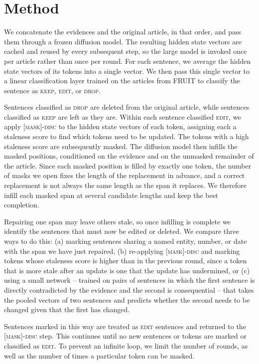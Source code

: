 \documentclass[11pt]{article}
\begin{document}
\section{Method}
We concatenate the evidences and the original article, in that order, and pass them through a frozen diffusion model. The resulting hidden state vectors are cached and reused by every subsequent step, so the large model is invoked once per article rather than once per round. For each sentence, we average the hidden state vectors of its tokens into a single vector. We then pass this single vector to a linear classification layer trained on the articles from FRUIT \citep{iv-etal-2022-fruit} to classify the sentence as \textsc{keep}, \textsc{edit}, or \textsc{drop}.

Sentences classified as \textsc{drop} are deleted from the original article, while sentences classified as \textsc{keep} are left as they are. Within each sentence classified \textsc{edit}, we apply \textsc{[mask]-disc} to the hidden state vectors of each token, assigning each a staleness score to find which tokens need to be updated. The tokens with a high staleness score are subsequently masked. The diffusion model then infills the masked positions, conditioned on the evidence and on the unmasked remainder of the article. Since each masked position is filled by exactly one token, the number of masks we open fixes the length of the replacement in advance, and a correct replacement is not always the same length as the span it replaces. We therefore infill each masked span at several candidate lengths and keep the best completion.

Repairing one span may leave others stale, so once infilling is complete we identify the sentences that must now be edited or deleted. We compare three ways to do this: (a) marking sentences sharing a named entity, number, or date with the span we have just repaired, (b) re-applying \textsc{[mask]-disc} and marking tokens whose staleness score is higher than in the previous round, since a token that is more stale after an update is one that the update has undermined, or (c) using a small network -- trained on pairs of sentences in which the first sentence is directly contradicted by the evidence and the second is consequential -- that takes the pooled vectors of two sentences and predicts whether the second needs to be changed given that the first has changed.

Sentences marked in this way are treated as \textsc{edit} sentences and returned to the \textsc{[mask]-disc} step. This continues until no new sentences or tokens are marked or classified as \textsc{edit}. To prevent an infinite loop, we limit the number of rounds, as well as the number of times a particular token can be masked.


\end{document}
